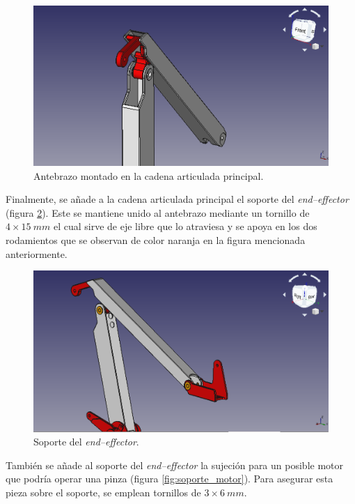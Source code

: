 \begin{figure}[H]
    \centering 
    \includegraphics[width=1\linewidth]{pictures/Antebrazo.png}
    \caption{Antebrazo montado en la cadena articulada principal.}
    \label{fig:antebrazo}
\end{figure}

Finalmente, se añade a la cadena articulada principal el soporte del \textit{end--effector} (figura \ref{fig:soporte_endeffector}). Este se mantiene unido al antebrazo mediante un tornillo de $4 \times 15~mm$ el cual sirve de eje libre que lo atraviesa y se apoya en los dos rodamientos que se observan de color naranja en la figura mencionada anteriormente.

\begin{figure}[H]
    \centering 
    \includegraphics[width=1\linewidth]{pictures/SoporteEndEffector.png}
    \caption{Soporte del \textit{end--effector}.}
    \label{fig:soporte_endeffector}
\end{figure}

También se añade al soporte del \textit{end--effector} la sujeción para un posible motor que podría operar una pinza (figura \ref{fig:soporte_motor}). Para asegurar esta pieza sobre el soporte, se emplean tornillos de $3 \times 6~mm$.

